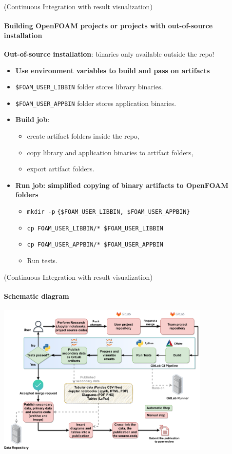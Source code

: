 \documentclass[
	aspectratio=169,%
	color={accentcolor=2d},
	logo=true,%
	colorframetitle=true,%
	]{tudabeamer}
\begin{document}
\begin{frame}[fragile]{(Continuous Integration with result visualization)} 
    \framesubtitle{Building OpenFOAM projects or projects with out-of-source installation}

    \vfill
    \textbf{Out-of-source installation}: binaries only available outside the repo! 
    \begin{itemize}
        \item \textbf{Use environment variables to build and pass on artifacts} 
        \item \texttt{\$FOAM\_USER\_LIBBIN} folder stores library binaries. 
        \item \texttt{\$FOAM\_USER\_APPBIN} folder stores application binaries. 
        \item \textbf{Build job}: 
            \begin{itemize}
                \item create artifact folders inside the repo, 
                \item copy library and application binaries to artifact folders, 
                \item export artifact folders. 
            \end{itemize}
        \item \textbf{Run job: \textbf{simplified} copying of binary artifacts to OpenFOAM folders}
            \begin{itemize} 
                \item \texttt{mkdir -p} \texttt{\{\$FOAM\_USER\_LIBBIN, \$FOAM\_USER\_APPBIN\}}
                \item \texttt{cp FOAM\_USER\_LIBBIN/* \$FOAM\_USER\_LIBBIN} 
                \item \texttt{cp FOAM\_USER\_APPBIN/* \$FOAM\_USER\_APPBIN} 
                \item Run tests.
            \end{itemize}
    \end{itemize}


\end{frame}

\begin{frame}{(Continuous Integration with result visualization)} 
	\framesubtitle{Schematic diagram}

	\centering
	\includegraphics[width=0.8\textwidth]{figures/ZINF-CI-diagram.pdf}

\end{frame}
\end{document}
